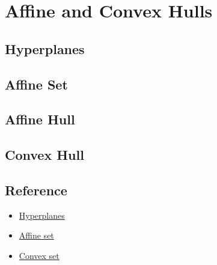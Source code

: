 \chapter{Affine and Convex   Hulls}

\section{Hyperplanes}

\section{Affine Set}

\section{Affine Hull}

\section{Convex Hull}

\section{Reference}
\begin{itemize}
    \item \href{https://www.sfu.ca/~mdevos/notes/geom-sym/}{Hyperplanes}
    \item \href{https://www.sfu.ca/~mdevos/notes/geom-sym/}{Affine set}
    \item \href{https://www.sfu.ca/~mdevos/notes/geom-sym/}{Convex set}
\end{itemize}